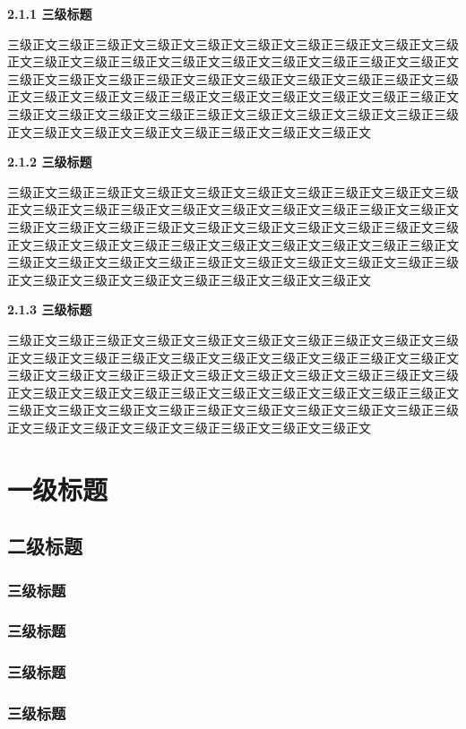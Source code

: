 \documentclass[]{article}
\begin{document}
\noindent \textbf{2.1.1 三级标题}
	
	三级正文三级正三级正文三级正文三级正文三级正文三级正三级正文三级正文三级正文三级正文三级正三级正文三级正文三级正文三级正文三级正三级正文三级正文三级正文三级正文三级正三级正文三级正文三级正文三级正文三级正三级正文三级正文三级正文三级正文三级正三级正文三级正文三级正文三级正文三级正三级正文三级正文三级正文三级正文三级正三级正文三级正文三级正文三级正文三级正三级正文三级正文三级正文三级正文三级正三级正文三级正文三级正文

\noindent \textbf{2.1.2 三级标题}

		三级正文三级正三级正文三级正文三级正文三级正文三级正三级正文三级正文三级正文三级正文三级正三级正文三级正文三级正文三级正文三级正三级正文三级正文三级正文三级正文三级正三级正文三级正文三级正文三级正文三级正三级正文三级正文三级正文三级正文三级正三级正文三级正文三级正文三级正文三级正三级正文三级正文三级正文三级正文三级正三级正文三级正文三级正文三级正文三级正三级正文三级正文三级正文三级正文三级正三级正文三级正文三级正文
		
\noindent \textbf{2.1.3 三级标题}

	三级正文三级正三级正文三级正文三级正文三级正文三级正三级正文三级正文三级正文三级正文三级正三级正文三级正文三级正文三级正文三级正三级正文三级正文三级正文三级正文三级正三级正文三级正文三级正文三级正文三级正三级正文三级正文三级正文三级正文三级正三级正文三级正文三级正文三级正文三级正三级正文三级正文三级正文三级正文三级正三级正文三级正文三级正文三级正文三级正三级正文三级正文三级正文三级正文三级正三级正文三级正文三级正文
	
\section{一级标题}
\subsection{二级标题}
\subsubsection{三级标题}
\subsubsection{三级标题}
\subsubsection{三级标题}
\subsubsection{三级标题}
\end{document}
